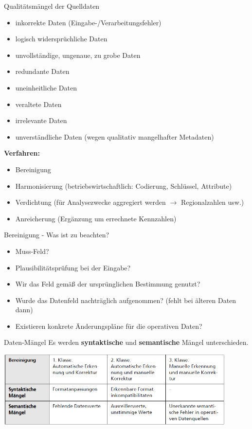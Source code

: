 \documentclass[a6paper,10pt,grid=front%
,toc
]{kartei}
\begin{document}
  \begin{karte}{Qualitätsmängel der Quelldaten}
    \begin{itemize} 
      \item inkorrekte Daten (Eingabe-/Verarbeitungsfehler)
      \item logisch widersprüchliche Daten
      \item unvollständige, ungenaue, zu grobe Daten
      \item redundante Daten
      \item uneinheitliche Daten
      \item veraltete Daten
      \item irrelevante Daten
      \item unverständliche Daten (wegen qualitativ mangelhafter Metadaten)
    \end{itemize}

    \textbf{Verfahren:}
    \begin{itemize}
      \item Bereinigung
      \item Harmonisierung (betriebswirtschaftlich: Codierung, Schlüssel, Attribute)
      \item Verdichtung (für Analysezwecke aggregiert werden $\rightarrow$ Regionalzahlen usw.)
      \item Anreicherung (Ergänzung um errechnete Kennzahlen)
    \end{itemize}
  \end{karte}

  \begin{karte}{Bereinigung - Was ist zu beachten?}
    \begin{itemize} 
      \item Muss-Feld?
      \item Plausibilitätsprüfung bei der Eingabe?
      \item Wir das Feld gemäß der ursprünglichen Bestimmung genutzt?
      \item Wurde das Datenfeld nachträglich aufgenommen? (fehlt bei älteren Daten dann)
      \item Existieren konkrete Änderungspläne für die operativen Daten?
    \end{itemize}    
  \end{karte}

  \begin{karte}{Daten-Mängel}
    Es werden \textbf{syntaktische} und \textbf{semantische} Mängel unterschieden.

    \includegraphics[width=0.9\textwidth]{img/maengel}
  \end{karte}
\end{document}
